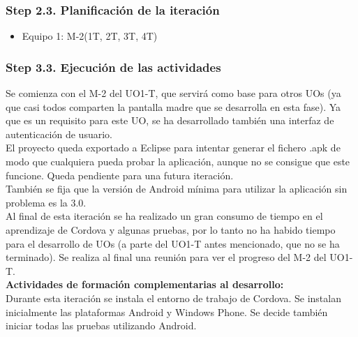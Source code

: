 \subsubsection{Step 2.3. Planificación de la iteración}
\label{it2:2.3}

\begin{itemize}
\item Equipo 1: M-2(1T, 2T, 3T, 4T)
\end{itemize}

\subsubsection{Step 3.3. Ejecución de las actividades}
\label{it2:3.3}

Se comienza con el M-2 del UO1-T, que servirá como base para otros UOs (ya que casi todos comparten la pantalla madre que se desarrolla en esta fase). Ya que es un requisito para este UO, se ha desarrollado también una interfaz de autenticación de usuario.\\

El proyecto queda exportado a Eclipse para intentar generar el fichero .apk de modo que cualquiera pueda probar la aplicación, aunque no se consigue que este funcione. Queda pendiente para una futura iteración.\\

También se fija que la versión de Android mínima para utilizar la aplicación sin problema es la 3.0.\\

Al final de esta iteración se ha realizado un gran consumo de tiempo en el aprendizaje de Cordova y algunas pruebas, por lo tanto no ha habido tiempo para el desarrollo de UOs (a parte del UO1-T antes mencionado, que no se ha terminado). Se realiza al final una reunión para ver el progreso del M-2 del UO1-T.\\

\textbf{Actividades de formación complementarias al desarrollo:}\\

Durante esta iteración se instala el entorno de trabajo de Cordova. Se instalan inicialmente las plataformas Android y Windows Phone. Se decide también iniciar todas las pruebas utilizando Android.\\


